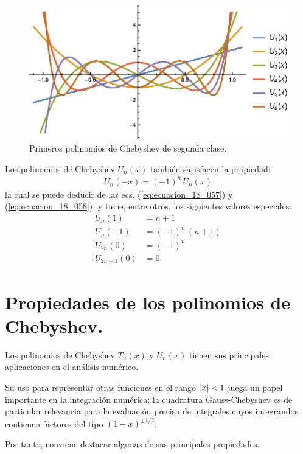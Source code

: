 \documentclass[12pt]{article}
\numberwithin{equation}{section}
\begin{document}
\begin{figure}[H]
    \centering
    \includegraphics[scale=1.2]{Imagenes/Plot_Polinomios_Chebychev_02.eps}
    \caption{Primeros polinomios de Chebyshev de segunda clase.}
    \label{fig:figura_plot_chebychev_02}
\end{figure}
Los polinomios de Chebyshev $U_{n}(x)$ también satisfacen la propiedad:
\begin{align*}
U_{n} (-x) = (-1)^{n} \, U_{n} (x)
\end{align*}
la cual se puede deducir de las ecs. (\ref{eq:ecuacion_18_057}) y (\ref{eq:ecuacion_18_058}), y tiene, entre otros, los siguientes valores especiales:
\begin{align*}
U_{n} (1) &= n + 1 \\[0.5em]
U_{n} (-1) &= (-1)^{n} \, (n + 1) \\[0.5em]
U_{2n} (0) &= (-1)^{n} \\[0.5em]
U_{2n+1} (0) &= 0
\end{align*}

\newpage
\section{Propiedades de los polinomios de Chebyshev.}

Los polinomios de Chebyshev $T_{n} (x)$ y $U_{n} (x)$ tienen sus principales aplicaciones en el análisis numérico.
\par
Su uso para representar otras funciones en el rango $\abs{x} < 1$ juega un papel importante en la integración numérica; la cuadratura Gauss-Chebyshev es de particular relevancia para la evaluación precisa de integrales cuyos integrandos contienen factores del tipo $(1 - x)^{\pm 1/2}$.
\par
Por tanto, conviene destacar algunas de sus principales propiedades.
\end{document}
